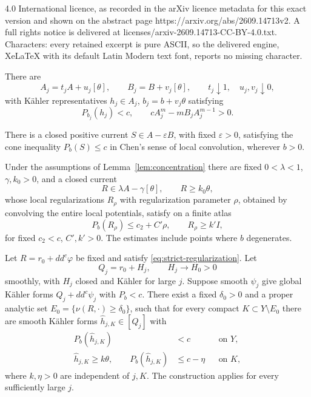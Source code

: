 \documentclass[10pt,a4paper]{amsart}
\begin{document}
4.0 International licence, as recorded in the arXiv licence metadata for this exact version and shown on the abstract page https://arxiv.org/abs/2609.14713v2. A full rights notice is delivered at licenses/arxiv-2609.14713-CC-BY-4.0.txt. Characters: every retained excerpt is pure ASCII, so the delivered engine, XeLaTeX with its default Latin Modern text font, reports no missing character.
\begin{lemma}\label{lem:resolution-approximation}
 There are
\[
A_j=t_jA+u_j[\theta],\qquad B_j=B+v_j[\theta],\qquad
t_j\downarrow1,\quad u_j,v_j\downarrow0,
\]
with K\"ahler representatives \(h_j\in A_j\), \(b_j=b+v_j\theta\) satisfying
\begin{equation}\label{eq:resolved-cone}
P_{b_j}(h_j)<c,\qquad cA_j^m-mB_jA_j^{m-1}>0.
\end{equation}
\end{lemma}

\begin{lemma}\label{lem:concentration}
There is a closed positive current \(S\in A-\varepsilon B\), with fixed \(\varepsilon>0\), satisfying the cone inequality \(P_b(S)\le c\) in Chen's sense of local convolution,  wherever \(b>0\). 
\end{lemma}

\begin{lemma}\label{lem:strict-current}
Under the assumptions of Lemma~\ref{lem:concentration} there are fixed \(0<\lambda<1\), \(\gamma,k_0>0\), and a closed current
\[
R\in\lambda A-\gamma[\theta],\qquad R\ge k_0\theta,
\]
whose local regularizations $R_\rho$ with regularization parameter $\rho$, obtained by convolving the entire local potentials, satisfy on a finite atlas
\begin{equation}\label{eq:strict-regularization}
P_b(R_\rho)\le c_2+C'\rho,\qquad R_\rho\ge k'I,
\end{equation}
for fixed \(c_2<c\), \(C',k'>0\). The estimates include points where \(b\) degenerates.
\end{lemma}

\begin{lemma}\label{lem:gluing}
Let \(R=r_0+dd^c\varphi\) be fixed and satisfy \eqref{eq:strict-regularization}. Let
\[
Q_j=r_0+H_j,\qquad H_j\longrightarrow H_0>0
\]
smoothly, with \(H_j\) closed and K\"ahler for large \(j\). Suppose smooth \(\psi_j\) give global K\"ahler forms \(Q_j+dd^c\psi_j\) with \(P_b<c\). There exist a fixed \(\delta_0>0\) and a proper analytic set \(E_0=\{\nu(R,\cdot)\ge\delta_0\}\), such that for every compact \(K\subset Y\setminus E_0\) there are smooth K\"ahler forms \(\widehat h_{j,K}\in[Q_j]\) with
\begin{equation}\label{eq:glued-forms}
\begin{aligned}
P_b(\widehat h_{j,K})&<c &&\text{on }Y,\\
\widehat h_{j,K}\ge k\theta,\qquad
P_b(\widehat h_{j,K})&\le c-\eta &&\text{on }K,
\end{aligned}
\end{equation}
where \(k,\eta>0\) are independent of \(j,K\). The construction applies for every sufficiently large \(j\). 
\end{lemma}
\end{document}
